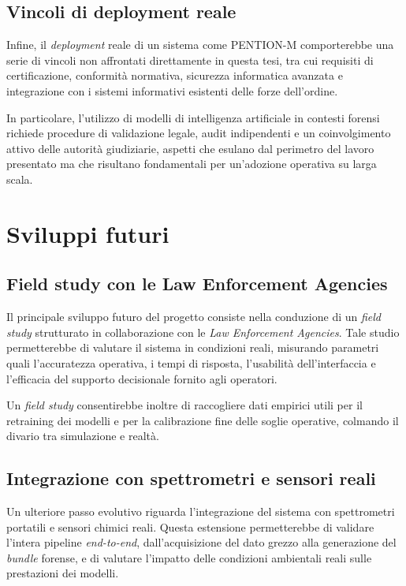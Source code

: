 \subsection{Vincoli di deployment reale}

Infine, il \textit{deployment} reale di un sistema come \textsc{PENTION-M} comporterebbe una serie di vincoli non affrontati direttamente in questa tesi, tra cui requisiti di certificazione, conformità normativa, sicurezza informatica avanzata e integrazione con i sistemi informativi esistenti delle forze dell’ordine.

In particolare, l’utilizzo di modelli di intelligenza artificiale in contesti forensi richiede procedure di validazione legale, audit indipendenti e un coinvolgimento attivo delle autorità giudiziarie, aspetti che esulano dal perimetro del lavoro presentato ma che risultano fondamentali per un’adozione operativa su larga scala.

\section{Sviluppi futuri}

\subsection{Field study con le Law Enforcement Agencies}

Il principale sviluppo futuro del progetto consiste nella conduzione di un \textit{field study} strutturato in collaborazione con le \emph{Law Enforcement Agencies}.
Tale studio permetterebbe di valutare il sistema in condizioni reali, misurando parametri quali l’accuratezza operativa, i tempi di risposta, l’usabilità dell’interfaccia e l’efficacia del supporto decisionale fornito agli operatori.

Un \textit{field study} consentirebbe inoltre di raccogliere dati empirici utili per il retraining dei modelli e per la calibrazione fine delle soglie operative, colmando il divario tra simulazione e realtà.

\subsection{Integrazione con spettrometri e sensori reali}

Un ulteriore passo evolutivo riguarda l’integrazione del sistema con spettrometri portatili e sensori chimici reali.
Questa estensione permetterebbe di validare l’intera pipeline \textit{end-to-end}, dall’acquisizione del dato grezzo alla generazione del \textit{bundle} forense, e di valutare l’impatto delle condizioni ambientali reali sulle prestazioni dei modelli.

